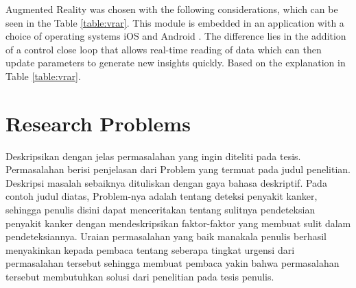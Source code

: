 \begin{table}[h!]
\centering
\caption{Comparison Between Virtual Reality With Augmented Reality.}
\label{table:vrar}
\end{table}


Augmented Reality was chosen with the following considerations, which can be seen in the Table \ref{table:vrar}. This module is embedded in an application with a choice of operating systems iOS and Android \cite{Majid2015}. The difference lies in the addition of a control close loop that allows real-time reading of data which can then update parameters to generate new insights quickly. Based on the explanation in Table \ref{table:vrar}. 

\section{Research Problems}
Deskripsikan dengan jelas permasalahan yang ingin diteliti pada tesis. Permasalahan berisi penjelasan dari Problem yang termuat pada judul penelitian. Deskripsi masalah sebaiknya dituliskan dengan gaya bahasa deskriptif. Pada contoh judul diatas, Problem-nya adalah tentang deteksi penyakit kanker, sehingga penulis disini dapat menceritakan tentang sulitnya pendeteksian penyakit kanker dengan mendeskripsikan faktor-faktor yang membuat sulit dalam pendeteksiannya. Uraian permasalahan yang baik manakala penulis berhasil menyakinkan kepada pembaca tentang seberapa tingkat urgensi dari permasalahan tersebut sehingga membuat pembaca yakin bahwa permasalahan tersebut membutuhkan solusi dari penelitian pada tesis penulis.
